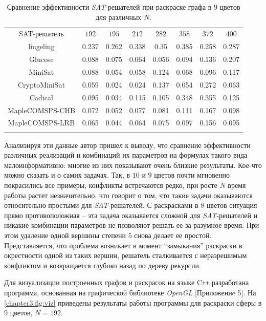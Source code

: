 \begin{table}[h!]
\centering
\captionsetup{justification=centering}
\caption{Сравнение эффективности \textit{SAT}-решателей при раскраске графа в $9$ цветов для различных $N$.}
\label{chapter3:tab:color9}
\begin{tabular}{@{}|c|c|c|c|c|c|c|c|}
\Xhline{4\arrayrulewidth}
SAT-решатель          & $192$ & $195$ & $212$ & $282$ & $358$ & $372$ & $400$ \\ \Xhline{4\arrayrulewidth}
lingeling             & 0.237 & 0.262 & 0.338 & 0.35  & 0.385 & 0.258 & 0.287 \\ \hline
Glucose               & 0.088 & 0.075 & 0.064 & 0.056 & 0.094 & 0.136 & 0.207 \\ \hline
MiniSat               & 0.088 & 0.054 & 0.058 & 0.124 & 0.068 & 0.096 & 0.117 \\ \hline
CryptoMiniSat         & 0.059 & 0.024 & 0.024 & 0.137 & 0.054 & 0.272 & 0.063 \\ \hline
Cadical               & 0.095 & 0.034 & 0.115 & 0.105 & 0.348 & 0.355 & 0.125 \\ \hline
MapleCOMSPS-CHB       & 0.072 & 0.052 & 0.077 & 0.081 & 0.111 & 0.167 & 0.098 \\ \hline
MapleCOMSPS-LRB       & 0.065 & 0.044 & 0.064 & 0.075 & 0.097 & 0.156 & 0.095 \\ \Xhline{4\arrayrulewidth}
\end{tabular}
\end{table}

Анализируя эти данные автор пришел к выводу, что сравнение эффективности различных 
реализаций и комбинаций их параметров на формулах такого вида малоинформативно: 
многие из них показывают очень близкие результаты. 
Кое-что можно сказать и о самих задачах. Так, в $10$ и $9$ цветов почти мгновенно покрасились все примеры, 
конфликты встречаются редко, при росте $N$ время работы растет незначительно, что говорит о том, 
что такие задачи оказываются относительно простыми для \textit{SAT}-решателей.
С раскрасками в $8$ цветов ситуация прямо противоположная -- эта задача оказывается 
сложной для \textit{SAT}-решателей и никакие комбинации параметров не позволяют решать ее за разумное время. 
При этом удаление одной вершины степени $5$ снова делает ее простой. 
Представляется, что проблема возникает в момент \enquote{замыкания} раскраски в окрестности одной из таких вершин, 
решатель сталкивается с неразрешимым конфликтом и возвращается глубоко назад по дереву рекурсии.

Для визуализации построенных графов и раскрасок на языке C\texttt{++} разработана программа, 
основанная на графической библиотеке \textit{OpenGL} [Приложениe 5]. 
На \figurename{ \ref{chapter3:fig:viz}} приведены результаты работы программы для раскраски сферы в $9$ цветов, $N=192$.

